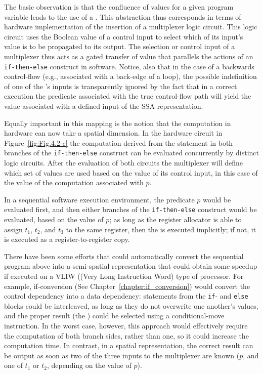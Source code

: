 The basic observation is that the confluence of values for a given program variable leads to the use of a \phifun. This \phifun abstraction thus corresponds in terms of hardware implementation of the insertion of a multiplexer logic circuit. This logic circuit uses the Boolean value of a control input to select which of its 
input's value is to be propagated to its output. The selection or control input of 
a multiplexer thus acts as a gated transfer of value that parallels the actions of 
an {\tt if-then-else} construct in software. Notice, also that in the case of a backwards control-flow (e.g., associated with a back-edge of a loop),  the possible indefinition of one of the  \phifun's inputs is transparently ignored by the fact that in a correct execution the predicate associated with the true control-flow path will yield the value associated with a defined input of the SSA representation.

Equally important in this mapping is the notion that the computation in hardware can now take a spatial dimension.  In the hardware circuit in Figure~\ref{fig:Fig.4.2-c} the computation derived from the statement in both branches of the {\tt if-then-else} construct can be evaluated concurrently by distinct logic circuits.  After the evaluation of both circuits the multiplexer will define which set of values are used based on the value of its control input, in this case of the value of the computation associated with $p$.

In a sequential software execution environment, the predicate $p$ would be evaluated first, and then either branches of the {\tt if-then-else} construct would be evaluated, based on the value of $p$;  as long as the register allocator is able to assign $t_1$, $t_2$, and $t_3$ to the same register, then the \phifun is executed implicitly;  if not, it is executed as a register-to-register copy.

There have been some efforts that could automatically convert the sequential program above into a semi-spatial representation that could obtain some speedup if executed on a VLIW ((Very Long Instruction Word) type of processor. 
For example, if-conversion (See Chapter~\ref{chapter:if_conversion}) would convert the control dependency into a data dependency:  statements from the {\tt if}- and {\tt else} blocks could be interleaved, as long as they do not overwrite one another's values, and the proper result (the \phifun) could be selected using a conditional-move instruction. In the worst case, however, this approach would effectively require the computation of both branch sides, rather than one, so it could increase the computation time.  In contrast, in a spatial representation, the correct result can be output as soon as two of the three inputs to the multiplexer are known ($p$, and one of $t_1$ or $t_2$, depending on the value of $p$).


